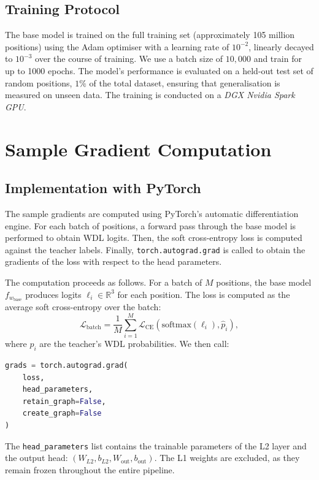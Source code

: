 \subsection{Training Protocol}\label{sec:training-protocol}

The base model is trained on the full training set (approximately 105 million positions) using the Adam optimiser with a learning rate of \(10^{-2}\), linearly decayed to \(10^{-3}\) over the course of training. We use a batch size of \(10{,}000\) and train for up to 1000 epochs. The model's performance is evaluated on a held-out test set of random positions, \(1\%\) of the total dataset, ensuring that generalisation is measured on unseen data. The training is conducted on a \emph{DGX Nvidia Spark GPU}.

\section{Sample Gradient Computation}\label{sec:grad-impl}

\subsection{Implementation with PyTorch}\label{sec:grad-pytorch}

The sample gradients are computed using PyTorch's automatic differentiation engine. For each batch of positions, a forward pass through the base model is performed to obtain WDL logits. Then, the soft cross-entropy loss is computed against the teacher labels. Finally, \texttt{torch.autograd.grad} is called to obtain the gradients of the loss with respect to the head parameters.

The computation proceeds as follows. For a batch of \(M\) positions, the base model \(f_{w_{\mathrm{base}}}\) produces logits \(\ell_i \in \mathbb{R}^3\) for each position. The loss is computed as the average soft cross-entropy over the batch:
\[
\mathcal{L}_{\mathrm{batch}} = \frac{1}{M} \sum_{i=1}^M \mathcal{L}_{\mathrm{CE}}(\mathrm{softmax}(\ell_i), \hat{p}_i),
\]
where \(\hat{p}_i\) are the teacher's WDL probabilities. We then call:
\begin{lstlisting}[language=Python,basicstyle=\ttfamily\footnotesize,breaklines=true]
grads = torch.autograd.grad(
    loss,
    head_parameters,
    retain_graph=False,
    create_graph=False
)
\end{lstlisting}
The \texttt{head\_parameters} list contains the trainable parameters of the L2 layer and the output head: \((W_{L2}, b_{L2}, W_{\mathrm{out}}, b_{\mathrm{out}})\). The L1 weights are excluded, as they remain frozen throughout the entire pipeline.

